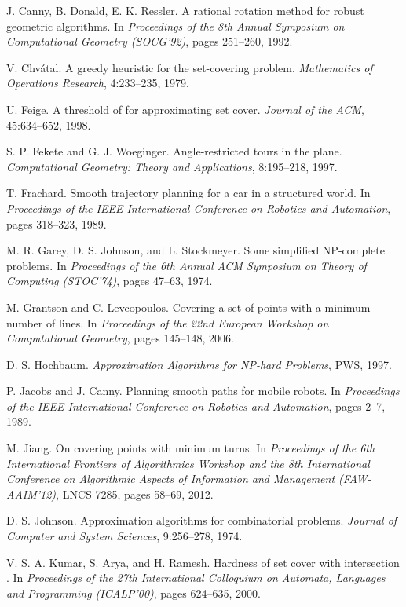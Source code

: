 \documentclass[letterpaper,11pt]{article}
\begin{document}
\begin{thebibliography}{99}
J. Canny, B. Donald, E. K. Ressler.
A rational rotation method for robust geometric algorithms.
In
\emph{Proceedings of the 8th Annual Symposium on Computational Geometry (SOCG'92)},
pages 251--260, 1992.

V. Chv\'atal.
A greedy heuristic for the set-covering problem.
\emph{Mathematics of Operations Research},
4:233--235, 1979.

U. Feige.
A threshold of  for approximating set cover.
\emph{Journal of the ACM},
45:634--652, 1998.

S. P. Fekete and G. J. Woeginger.
Angle-restricted tours in the plane.
\emph{Computational Geometry: Theory and Applications},
8:195--218, 1997.

T. Frachard.
Smooth trajectory planning for a car in a structured world.
In \emph{Proceedings of the IEEE International Conference on Robotics
  and Automation}, 
pages 318--323, 1989.

M. R. Garey, D. S. Johnson, and L. Stockmeyer.
Some simplified NP-complete problems.
In \emph{Proceedings of the 6th Annual ACM Symposium on Theory of
  Computing (STOC'74)}, 
pages 47--63, 1974.

M. Grantson and C. Levcopoulos.
Covering a set of points with a minimum number of lines.
In \emph{Proceedings of the 22nd European Workshop on Computational Geometry},
pages 145--148, 2006.

D. S. Hochbaum.
\emph{Approximation Algorithms for NP-hard Problems},
PWS, 1997.

P. Jacobs and J. Canny.
Planning smooth paths for mobile robots.
In \emph{Proceedings of the IEEE International Conference on Robotics and Automation},
pages 2--7, 1989.

M. Jiang.
On covering points with minimum turns.
In \emph{Proceedings of the 6th International Frontiers of Algorithmics
  Workshop and the 8th International Conference on Algorithmic Aspects
  of Information and Management (FAW-AAIM'12)}, 
LNCS 7285, pages 58--69, 2012.

D. S. Johnson.
Approximation algorithms for combinatorial problems.
\emph{Journal of Computer and System Sciences},
9:256--278, 1974.

V. S. A. Kumar, S. Arya, and H. Ramesh.
Hardness of set cover with intersection .
In \emph{Proceedings of the 27th International Colloquium on Automata,
  Languages and Programming (ICALP'00)}, 
pages 624--635, 2000.


\end{thebibliography}
\end{document}
